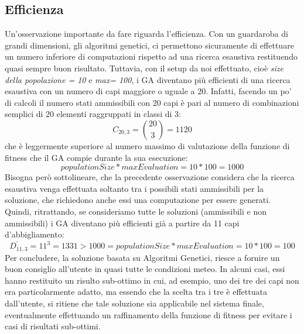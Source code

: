 \documentclass[a4paper, 11pt, oneside]{report}
\begin{document}
            \subsection{Efficienza}\label{subsec:efficienza}
            Un'osservazione importante da fare riguarda l'efficienza.
            Con un guardaroba di grandi dimensioni, gli algoritmi genetici,
            ci permettono sicuramente di effettuare un numero inferiore di computazioni rispetto ad una ricerca esaustiva
            restituendo quasi sempre buon risultato.
            Tuttavia, con il setup da noi effettuato, cioè \emph{size della popolazione = 10} e
            \emph{max= 100}, i GA diventano più efficienti di una ricerca esaustiva con un numero di capi
            maggiore o uguale a 20.
            Infatti, facendo un po' di calcoli il numero stati ammissibili con 20 capi è pari al numero di combinazioni semplici
            di 20 elementi raggruppati in classi di 3:
            \begin{equation*}
                C_{20,3}=\binom{20}{3}= 1120
            \end{equation*}
            che è leggermente superiore al numero massimo di valutazione della funzione di fitness che il GA compie durante la sua esecuzione:
            \begin{equation*}
                populationSize * maxEvaluation = 10 * 100 = 1000
            \end{equation*}
            Bisogna però sottolineare, che la precedente osservazione considera che la ricerca esaustiva venga effettuata soltanto
            tra i possibili stati ammissibili per la soluzione, che richiedono anche essi una computazione per essere generati.
            Quindi, ritrattando, se consideriamo tutte le soluzioni (ammissibili e non ammissibili) i GA diventano più efficienti già a partire da
            11 capi d'abbigliamento:
            \begin{equation*}
                D_{11,3}^{'}=11^3 = 1331  > 1000 = populationSize * maxEvaluation = 10 * 100 = 100
            \end{equation*}
            Per concludere, la soluzione basata su Algoritmi Genetici, riesce a fornire un buon consiglio all'utente
            in quasi tutte le condizioni meteo.
            In alcuni casi, essi hanno restituito un risulto sub-ottimo in cui, ad esempio, uno dei tre dei capi non era
            particolarmente adatto, ma essendo che la scelta tra i tre è effettuata dall'utente, si ritiene che tale soluzione
            sia applicabile nel sistema finale, eventualmente effettuando un raffinamento della funzione di fitness per
            evitare i casi di risultati sub-ottimi.
\end{document}
